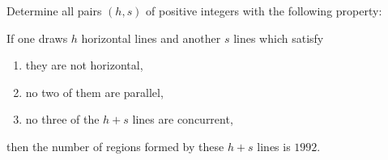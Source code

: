 Determine all pairs $(h,s)$ of positive integers with the following property:

If one draws $h$ horizontal lines and another $s$ lines which satisfy
\begin{enumerate}[label=(\roman*)]
	\item they are not horizontal,
	\item no two of them are parallel,
	\item no three of the $h + s$ lines are concurrent,
\end{enumerate}
then the number of regions formed by these $h + s$ lines is $1992$.